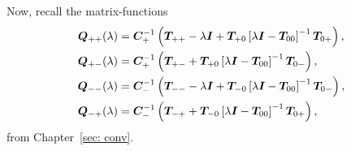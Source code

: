 Now, recall the matrix-functions
\begin{align*}
	\boldsymbol Q_{++}(\lambda) &= \boldsymbol C_+^{-1} \left(\boldsymbol T_{++} - \lambda \boldsymbol I + \boldsymbol T_{+0}\left[\lambda \boldsymbol I - \boldsymbol T_{00}\right]^{-1}\boldsymbol T_{0+}\right),
	\\\boldsymbol Q_{+-}(\lambda) &= \boldsymbol C_+^{-1} \left(\boldsymbol T_{+-} + \boldsymbol T_{+0}\left[\lambda \boldsymbol I - \boldsymbol T_{00}\right]^{-1}\boldsymbol T_{0-} \right) ,
	\\\boldsymbol Q_{--}(\lambda) &= \boldsymbol C_-^{-1} \left(\boldsymbol T_{--}  - \lambda \boldsymbol I + \boldsymbol T_{-0}\left[\lambda \boldsymbol I - \boldsymbol T_{00}\right]^{-1}\boldsymbol T_{0-}\right),
	\\\boldsymbol Q_{-+}(\lambda) &=\boldsymbol C_-^{-1} \left(\boldsymbol T_{-+}+ \boldsymbol T_{-0}\left[\lambda \boldsymbol I - \boldsymbol T_{00}\right]^{-1}\boldsymbol T_{0+}\right) ,
\end{align*}
from Chapter~\ref{sec: conv}.

